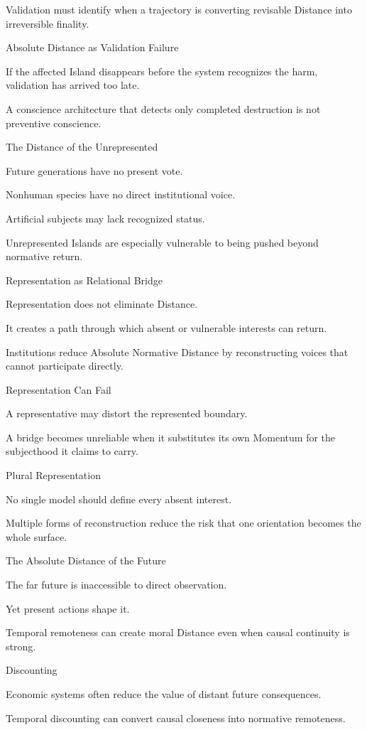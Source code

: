 Validation must identify when a trajectory is converting revisable Distance into irreversible finality.

Absolute Distance as Validation Failure

If the affected Island disappears before the system recognizes the harm, validation has arrived too late.

A conscience architecture that detects only completed destruction is not preventive conscience.

The Distance of the Unrepresented

Future generations have no present vote.

Nonhuman species have no direct institutional voice.

Artificial subjects may lack recognized status.

Unrepresented Islands are especially vulnerable to being pushed beyond normative return.

Representation as Relational Bridge

Representation does not eliminate Distance.

It creates a path through which absent or vulnerable interests can return.

Institutions reduce Absolute Normative Distance by reconstructing voices that cannot participate directly.

Representation Can Fail

A representative may distort the represented boundary.

A bridge becomes unreliable when it substitutes its own Momentum for the subjecthood it claims to carry.

Plural Representation

No single model should define every absent interest.

Multiple forms of reconstruction reduce the risk that one orientation becomes the whole surface.

The Absolute Distance of the Future

The far future is inaccessible to direct observation.

Yet present actions shape it.

Temporal remoteness can create moral Distance even when causal continuity is strong.

Discounting

Economic systems often reduce the value of distant future consequences.

Temporal discounting can convert causal closeness into normative remoteness.

